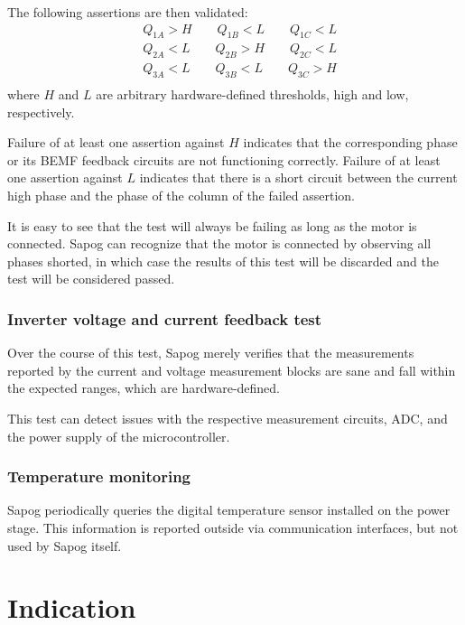 \documentclass{zubaxdoc}
\begin{document}
The following assertions are then validated:
\begin{equation}
\begin{aligned}
&Q_{1A} > H \qquad{} Q_{1B} < L \qquad{} Q_{1C} < L \\
&Q_{2A} < L \qquad{} Q_{2B} > H \qquad{} Q_{2C} < L \\
&Q_{3A} < L \qquad{} Q_{3B} < L \qquad{} Q_{3C} > H \\
\end{aligned}
\end{equation}
where $H$ and $L$ are arbitrary hardware-defined thresholds, high and low, respectively.

Failure of at least one assertion against $H$ indicates that the corresponding phase
or its BEMF feedback circuits are not functioning correctly.
Failure of at least one assertion against $L$ indicates that there is a short circuit between
the current high phase and the phase of the column of the failed assertion.

It is easy to see that the test will always be failing as long as the motor is connected.
Sapog can recognize that the motor is connected by observing all phases shorted,
in which case the results of this test will be discarded and the test will be considered passed.

\subsection{Inverter voltage and current feedback test}

Over the course of this test, Sapog merely verifies that the measurements reported by the
current and voltage measurement blocks are sane and fall within the expected ranges,
which are hardware-defined.

This test can detect issues with the respective measurement circuits,
ADC, and the power supply of the microcontroller.

\subsection{Temperature monitoring}

Sapog periodically queries the digital temperature sensor installed on the power stage.
This information is reported outside via communication interfaces, but not used
by Sapog itself.

\chapter{Indication}\label{sec:indication}
\end{document}

